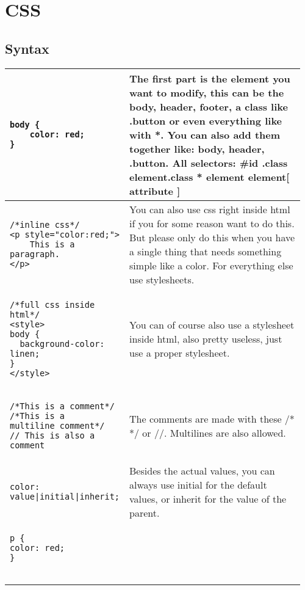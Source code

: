 \documentclass[main.tex,fontsize=8pt,paper=a4,paper=portrait,DIV=calc,]{scrartcl}
\begin{document}
\begin{table}[h!]
\section{CSS}
\subsection{Syntax}
\begin{tabular}{|m{0.35\linewidth}|m{0.605\linewidth}|}

\hline
\begin{lstlisting}
body { 
    color: red;
}
\end{lstlisting}
&
The first part is the element you want to modify, this can be the body, header, footer, a class like .button or even everything like with *. You can also add them together like: body, header, .button. \newline
\textbf{All selectors: \#id .class element.class * element element[ attribute ]}\\

\hline
\begin{lstlisting}
/*inline css*/
<p style="color:red;">
    This is a paragraph.
</p>
\end{lstlisting}
&
You can also use css right inside html if you for some reason want to do this. But please only do this when you have a single thing that needs something simple like a color. \newline For everything else use stylesheets.
\\

\hline
\begin{lstlisting}
/*full css inside html*/
<style>
body {
  background-color: linen;
}
</style>
\end{lstlisting}
&
You can of course also use a stylesheet inside html, also pretty useless, just use a proper stylesheet.
\\

\hline
\begin{lstlisting}
/*This is a comment*/ 
/*This is a 
multiline comment*/
// This is also a comment
\end{lstlisting}
&
The comments are made with these /* */ or //. Multilines are also allowed.
\\
\hline
\begin{lstlisting}
color: value|initial|inherit;
\end{lstlisting}
&
Besides the actual values, you can always use initial for the default values, or inherit for the value of the parent.\\
\hline
\begin{lstlisting}
p {
color: red;
}


\end{lstlisting}
\end{tabular}
\end{table}
\end{document}
